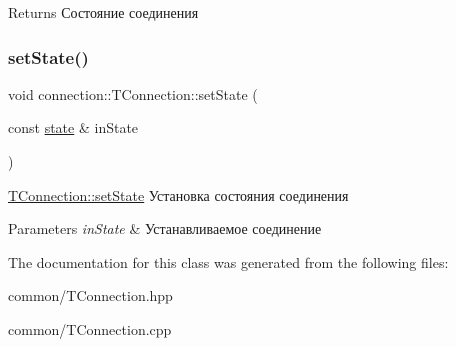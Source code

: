 \begin{DoxyReturn}{Returns}
Состояние соединения 
\end{DoxyReturn}
\mbox{\label{classconnection_1_1_t_connection_aa61ae6037f6b70cd97c9fc9c04f43629}} 
\subsubsection{\texorpdfstring{set\+State()}{setState()}}
{\footnotesize\ttfamily void connection\+::\+T\+Connection\+::set\+State (\begin{DoxyParamCaption}\item[{const \hyperlink{classconnection_1_1_t_connection_aee7dfb7510592bd2697ab6f906b9612c}{state} \&}]{in\+State }\end{DoxyParamCaption})}



\hyperlink{classconnection_1_1_t_connection_aa61ae6037f6b70cd97c9fc9c04f43629}{T\+Connection\+::set\+State} Установка состояния соединения 


\begin{DoxyParams}{Parameters}
{\em in\+State} & Устанавливаемое соединение \\
\hline
\end{DoxyParams}


The documentation for this class was generated from the following files\+:\begin{DoxyCompactItemize}
\item 
common/T\+Connection.\+hpp\item 
common/T\+Connection.\+cpp\end{DoxyCompactItemize}

